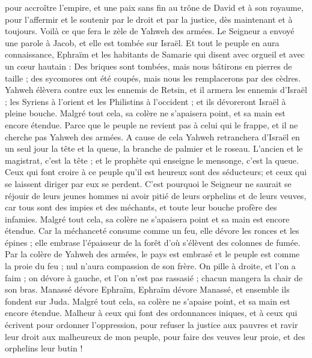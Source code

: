 \begin{multicols}{2}
pour accroître l'empire, et une paix sans fin au trône de David et à son royaume, pour l'affermir et le soutenir par le droit et par la justice, dès maintenant et à toujours. Voilà ce que fera le zèle de Yahweh des armées.
Le Seigneur a envoyé une parole à Jacob, et elle est tombée sur Israël.
Et tout le peuple en aura connaissance, Ephraïm et les habitants de Samarie qui disent avec orgueil et avec un cœur hautain :
Des briques sont tombées, mais nous bâtirons en pierres de taille ; des sycomores ont été coupés, mais nous les remplacerons par des cèdres.
Yahweh élèvera contre eux les ennemis de Retsin, et il armera les ennemis d'Israël ;
les Syriens à l'orient et les Philistins à l'occident ; et ils dévoreront Israël à pleine bouche. Malgré tout cela, sa colère ne s'apaisera point, et sa main est encore étendue.
Parce que le peuple ne revient pas à celui qui le frappe, et il ne cherche pas Yahweh des armées.
A cause de cela Yahweh retranchera d'Israël en un seul jour la tête et la queue, la branche de palmier et le roseau.
L'ancien et le magistrat, c'est la tête ; et le prophète qui enseigne le mensonge, c'est la queue.
Ceux qui font croire à ce peuple qu'il est heureux sont des séducteurs; et ceux qui se laissent diriger par eux se perdent.
C'est pourquoi le Seigneur ne saurait se réjouir de leurs jeunes hommes ni avoir pitié de leurs orphelins et de leurs veuves, car tous sont des impies et des méchants, et toute leur bouche profère des infamies. Malgré tout cela, sa colère ne s'apaisera point et sa main est encore étendue.
Car la méchanceté consume comme un feu, elle dévore les ronces et les épines ; elle embrase l'épaisseur de la forêt d'où s'élèvent des colonnes de fumée.
Par la colère de Yahweh des armées, le pays est embrasé et le peuple est comme la proie du feu ; nul n'aura compassion de son frère.
On pille à droite, et l'on a faim ; on dévore à gauche, et l'on n'est pas rassasié ; chacun mangera la chair de son bras.
Manassé dévore Ephraïm, Ephraïm dévore Manassé, et ensemble ils fondent sur Juda. Malgré tout cela, sa colère ne s'apaise point, et sa main est encore étendue.
\VerseOne{}Malheur à ceux qui font des ordonnances iniques, et à ceux qui écrivent pour ordonner l'oppression,
pour refuser la justice aux pauvres et ravir leur droit aux malheureux de mon peuple, pour faire des veuves leur proie, et des orphelins leur butin !

\end{multicols}
